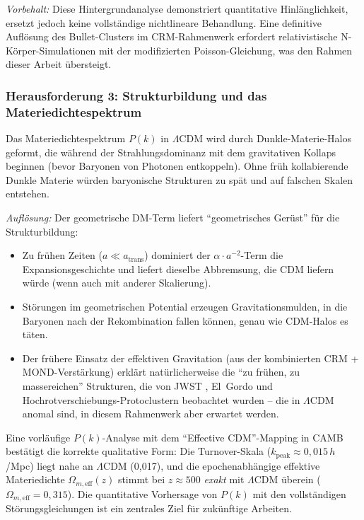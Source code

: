 \documentclass[aps,prd,twocolumn,superscriptaddress,nofootinbib,floatfix]{revtex4-2}
\begin{document}
\textit{Vorbehalt:} Diese Hintergrundanalyse demonstriert quantitative Hinlänglichkeit, ersetzt jedoch keine vollständige nichtlineare Behandlung. Eine definitive Auflösung des Bullet-Clusters im CRM-Rahmenwerk erfordert relativistische N-Körper-Simulationen mit der modifizierten Poisson-Gleichung, was den Rahmen dieser Arbeit übersteigt.

\subsubsection{Herausforderung 3: Strukturbildung und das Materiedichtespektrum}

Das Materiedichtespektrum $P(k)$ in $\Lambda$CDM wird durch Dunkle-Materie-Halos geformt, die während der Strahlungsdominanz mit dem gravitativen Kollaps beginnen (bevor Baryonen von Photonen entkoppeln). Ohne früh kollabierende Dunkle Materie würden baryonische Strukturen zu spät und auf falschen Skalen entstehen.

\textit{Auflösung:} Der geometrische DM-Term liefert "`geometrisches Gerüst"' für die Strukturbildung:
\begin{itemize}
\item Zu frühen Zeiten ($a \ll a_{\mathrm{trans}}$) dominiert der $\alpha \cdot a^{-2}$-Term die Expansionsgeschichte und liefert dieselbe Abbremsung, die CDM liefern würde (wenn auch mit anderer Skalierung).
\item Störungen im geometrischen Potential erzeugen Gravitationsmulden, in die Baryonen nach der Rekombination fallen können, genau wie CDM-Halos es täten.
\item Der frühere Einsatz der effektiven Gravitation (aus der kombinierten CRM + MOND-Verstärkung) erklärt natürlicherweise die "`zu frühen, zu massereichen"' Strukturen, die von JWST \cite{Labbe2023}, El~Gordo \cite{Asencio2023} und Hochrotverschiebungs-Protoclustern \cite{Miller2018} beobachtet wurden -- die in $\Lambda$CDM anomal sind, in diesem Rahmenwerk aber erwartet werden.
\end{itemize}

Eine vorläufige $P(k)$-Analyse mit dem "`Effective CDM"'-Mapping in CAMB \cite{Lewis2000} bestätigt die korrekte qualitative Form: Die Turnover-Skala ($k_{\mathrm{peak}} \approx 0{,}015$\,$h$/Mpc) liegt nahe an $\Lambda$CDM (0{,}017), und die epochenabhängige effektive Materiedichte $\Omega_{m,\mathrm{eff}}(z)$ stimmt bei $z \approx 500$ \textit{exakt} mit $\Lambda$CDM überein ($\Omega_{m,\mathrm{eff}} = 0{,}315$). Die quantitative Vorhersage von $P(k)$ mit den vollständigen Störungsgleichungen ist ein zentrales Ziel für zukünftige Arbeiten.
\end{document}
